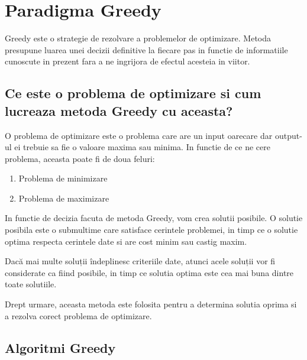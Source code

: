 \chapter{Paradigma Greedy}
 Greedy este o strategie de rezolvare a problemelor de optimizare. Metoda presupune luarea unei decizii definitive la fiecare pas in functie de informatiile cunoscute in prezent fara a ne ingrijora de efectul acesteia in viitor.


\section{Ce este o problema de optimizare si cum lucreaza metoda Greedy cu aceasta?}

O problema de optimizare este o problema care are un input oarecare dar output-ul ei trebuie sa fie o valoare maxima sau minima.
In functie de ce ne cere problema, aceasta poate fi de doua feluri: 
\begin{enumerate}
\item Problema de minimizare 
\par
{}
\par
\item Problema de maximizare
\par
\end{enumerate}

 In functie de decizia facuta de metoda Greedy, vom crea solutii posibile. O solutie posibila este o submultime care satisface cerintele problemei, in timp ce o solutie optima respecta cerintele date si are cost minim sau castig maxim.
  \par 
  Dacă mai multe soluții îndeplinesc criteriile date, atunci acele soluții vor fi considerate ca fiind posibile, in timp ce solutia optima este cea mai buna dintre toate solutiile.
  \par 
  Drept urmare, aceasta metoda este folosita pentru a determina
  solutia oprima si a rezolva corect problema de optimizare.


\section{Algoritmi Greedy}
